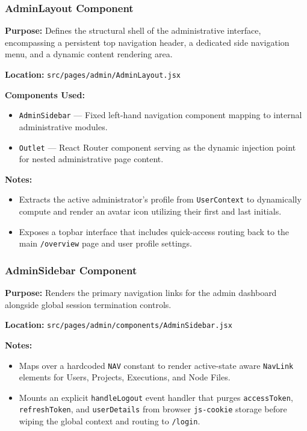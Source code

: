\subsubsection{AdminLayout Component}

\textbf{Purpose:} Defines the structural shell of the administrative interface, encompassing a persistent top navigation header, a dedicated side navigation menu, and a dynamic content rendering area.

\vspace{0.2cm}
\noindent\textbf{Location:} \texttt{src/pages/admin/AdminLayout.jsx}

\vspace{0.2cm}
\noindent\textbf{Components Used:}
\begin{itemize}
    \item \texttt{AdminSidebar} --- Fixed left-hand navigation component mapping to internal administrative modules.
    \item \texttt{Outlet} --- React Router component serving as the dynamic injection point for nested administrative page content.
\end{itemize}

\vspace{0.2cm}
\noindent\textbf{Notes:}
\begin{itemize}
    \item Extracts the active administrator's profile from \texttt{UserContext} to dynamically compute and render an avatar icon utilizing their first and last initials.
    \item Exposes a topbar interface that includes quick-access routing back to the main \texttt{/overview} page and user profile settings.
\end{itemize}

\subsubsection{AdminSidebar Component}

\textbf{Purpose:} Renders the primary navigation links for the admin dashboard alongside global session termination controls.

\vspace{0.2cm}
\noindent\textbf{Location:} \texttt{src/pages/admin/components/AdminSidebar.jsx}

\vspace{0.2cm}
\noindent\textbf{Notes:}
\begin{itemize}
    \item Maps over a hardcoded \texttt{NAV} constant to render active-state aware \texttt{NavLink} elements for Users, Projects, Executions, and Node Files.
    \item Mounts an explicit \texttt{handleLogout} event handler that purges \texttt{accessToken}, \texttt{refreshToken}, and \texttt{userDetails} from browser \texttt{js-cookie} storage before wiping the global context and routing to \texttt{/login}.
\end{itemize}

